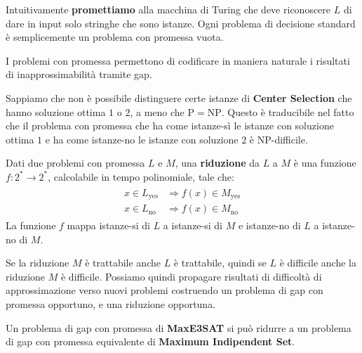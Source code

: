 \documentclass[\main/main.tex]{subfiles}
\begin{document}
\begin{multicols}{2}
\begin{definition}
    Intuitivamente \textbf{promettiamo} alla macchina di Turing che deve riconoscere \(L\) di dare in input solo stringhe che sono istanze. Ogni problema di decisione standard è semplicemente un problema con promessa vuota.
\end{definition}
\begin{observation}
    I problemi con promessa permettono di codificare in maniera naturale i risultati di inapprossimabilità tramite gap. 
\end{observation}
\begin{example}
    Sappiamo che non è possibile distinguere certe istanze di \textbf{Center Selection} che hanno soluzione ottima \(1\) o \(2\), a meno che \(\mathrm{P}=\mathrm{NP}\). Questo è traducibile nel fatto che il problema con promessa che ha come istanze-sì le istanze con soluzione ottima \(1\) e ha come istanze-no le istanze con soluzione \(2\) è NP-difficile.
\end{example}
\begin{definition}[Riduzione]
    Dati due problemi con promessa \(L\) e \(M\), una \textbf{riduzione} da \(L\) a \(M\) è una funzione \(f : 2^{*} \rightarrow 2^{*}\), calcolabile in tempo polinomiale, tale che:
    \begin{align*}
        \begin{aligned}
            x \in L_{\mathrm{yes}} & \Longrightarrow f(x) \in M_{\mathrm{yes}} \\
            x \in L_{\mathrm{no}} & \Longrightarrow f(x) \in M_{\mathrm{no}}
        \end{aligned}
    \end{align*}
    La funzione \(f\) mappa istanze-si di \(L\) a istanze-si di \(M\) e istanze-no di \(L\) a istanze-no di \(M\).
\end{definition}
\begin{observation}
    Se la riduzione \(M\) è trattabile anche \(L\) è trattabile, quindi se \(L\) è difficile anche la riduzione \(M\) è difficile. Possiamo quindi propagare risultati di difficoltà di approssimazione verso nuovi problemi costruendo un problema di gap con promessa opportuno, e una riduzione opportuna.
\end{observation}
\begin{example}
    Un problema di gap con promessa di \textbf{MaxE3SAT} si può ridurre a un problema di gap con promessa equivalente di \textbf{Maximum Indipendent Set}.
    

\end{example}
\end{multicols}
\end{document}
